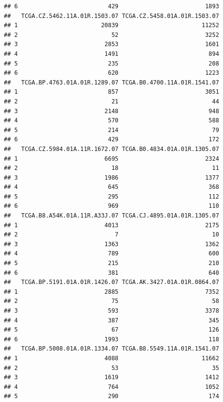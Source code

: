 \documentclass[
]{article}
\begin{document}
\begin{verbatim}
## 6                          429                         1893
##   TCGA.CZ.5462.11A.01R.1503.07 TCGA.CZ.5458.01A.01R.1503.07
## 1                        20839                        11252
## 2                           52                         3252
## 3                         2853                         1601
## 4                         1491                          894
## 5                          235                          208
## 6                          620                         1223
##   TCGA.BP.4763.01A.01R.1289.07 TCGA.B0.4700.11A.01R.1541.07
## 1                          857                         3051
## 2                           21                           44
## 3                         2148                          948
## 4                          570                          588
## 5                          214                           79
## 6                          429                          172
##   TCGA.CZ.5984.01A.11R.1672.07 TCGA.B0.4834.01A.01R.1305.07
## 1                         6695                         2324
## 2                           18                           11
## 3                         1986                         1377
## 4                          645                          368
## 5                          295                          112
## 6                          969                          110
##   TCGA.B8.A54K.01A.11R.A33J.07 TCGA.CJ.4895.01A.01R.1305.07
## 1                         4013                         2175
## 2                            7                           10
## 3                         1363                         1362
## 4                          789                          600
## 5                          215                          210
## 6                          381                          640
##   TCGA.BP.5191.01A.01R.1426.07 TCGA.AK.3427.01A.01R.0864.07
## 1                         2885                         7352
## 2                           75                           58
## 3                          593                         3378
## 4                          387                          345
## 5                           67                          126
## 6                         1993                          118
##   TCGA.BP.5008.01A.01R.1334.07 TCGA.B8.5549.11A.01R.1541.07
## 1                         4088                        11662
## 2                           53                           35
## 3                         1619                         1412
## 4                          764                         1052
## 5                          290                          174

\end{verbatim}
\end{document}
